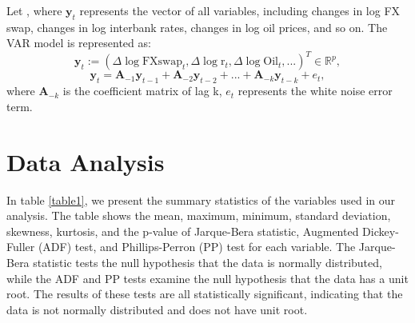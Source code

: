 \documentclass[12pt]{article}
\newcommand{\matr}[1]{\mathbf{#1}} %
\begin{document}
\begin{sloppypar}
Let , where $\matr{y}_t$ represents the vector of all variables, including changes in log FX swap, changes in log interbank rates, changes in log oil prices, and so on. The VAR model is represented as:
$$\matr{y}_t := (\Delta \log \text{FXswap}_t, \Delta \log \text{r}_t, \Delta \log \text{Oil}_t, ...)^T \in \mathbb{R}^p,$$
$$\matr{y}_t = \matr{A}_{-1}\matr{y}_{t-1}+\matr{A}_{-2}\matr{y}_{t-2}+...+\matr{A}_{-k}\matr{y}_{t-k}+e_t,$$
where $\matr{A}_{-k}$ is the coefficient matrix of lag k, $e_t$ represents the white noise error term.

\newpage
\section{Data Analysis}
In table \ref{table1}, we present the summary statistics of the variables used in our analysis. The table shows the mean, maximum, minimum, standard deviation, skewness, kurtosis, and the p-value of Jarque-Bera statistic, Augmented Dickey-Fuller (ADF) test, and Phillips-Perron (PP) test for each variable. The Jarque-Bera statistic tests the null hypothesis that the data is normally distributed, while the ADF and PP tests examine the null hypothesis that the data has a unit root. The results of these tests are all statistically significant, indicating that the data is not normally distributed and does not have unit root.
\begin{table}[h]
    \centering
    \caption{Summary Statistics of the Return rates}
    \label{table1}
\end{table}
\end{sloppypar}
\end{document}
